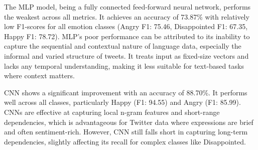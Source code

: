 \documentclass{article}
\begin{document}
\begin{table}[H]
\centering
\caption{Performance Metrics of Models on Sentiment Classes}
\label{tab:model-performance}
\end{table}

The MLP model, being a fully connected feed-forward neural network, performs the weakest across all metrics. It achieves an accuracy of 73.87\% with relatively low F1-scores for all emotion classes (Angry F1: 75.46, Disappointed F1: 67.35, Happy F1: 78.72). MLP's poor performance can be attributed to its inability to capture the sequential and contextual nature of language data, especially the informal and varied structure of tweets. It treats input as fixed-size vectors and lacks any temporal understanding, making it less suitable for text-based tasks where context matters.

CNN shows a significant improvement with an accuracy of 88.70\%. It performs well across all classes, particularly Happy (F1: 94.55) and Angry (F1: 85.99). CNNs are effective at capturing local n-gram features and short-range dependencies, which is advantageous for Twitter data where expressions are brief and often sentiment-rich. However, CNN still falls short in capturing long-term dependencies, slightly affecting its recall for complex classes like Disappointed.
\end{document}
